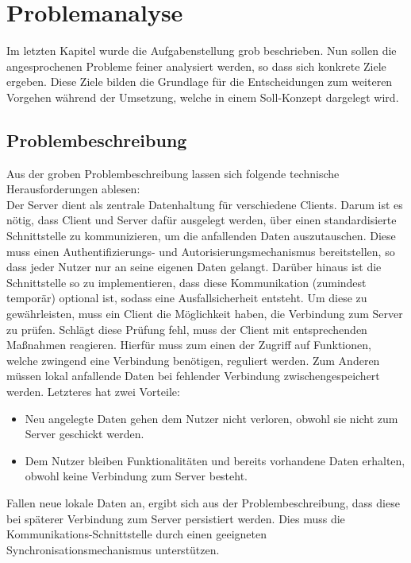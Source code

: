 \chapter{Problemanalyse}
\label{cha:problemanalyse}
Im letzten Kapitel wurde die Aufgabenstellung grob beschrieben. Nun sollen die angesprochenen Probleme feiner analysiert werden, so dass sich konkrete Ziele ergeben. Diese Ziele bilden die Grundlage für die Entscheidungen zum weiteren Vorgehen während der Umsetzung, welche in einem Soll-Konzept dargelegt wird.
\section{Problembeschreibung}
\label{sec:problembeschreibung}
Aus der groben Problembeschreibung lassen sich folgende technische Herausforderungen ablesen:\\
Der Server dient als zentrale Datenhaltung für verschiedene Clients. Darum ist es nötig, dass Client und Server dafür ausgelegt werden, über einen standardisierte Schnittstelle zu kommunizieren, um die anfallenden Daten auszutauschen. Diese muss einen Authentifizierungs- und Autorisierungsmechanismus bereitstellen, so dass jeder Nutzer nur an seine eigenen Daten gelangt. Darüber hinaus ist die Schnittstelle so zu implementieren, dass diese Kommunikation (zumindest temporär) optional ist, sodass eine Ausfallsicherheit entsteht. Um diese zu gewährleisten, muss ein Client die Möglichkeit haben, die Verbindung zum Server zu prüfen. Schlägt diese Prüfung fehl, muss der Client mit entsprechenden Maßnahmen reagieren. Hierfür muss zum einen der Zugriff auf Funktionen, welche zwingend eine Verbindung benötigen, reguliert werden. Zum Anderen müssen lokal anfallende Daten bei fehlender Verbindung zwischengespeichert werden. Letzteres hat zwei Vorteile:
\begin{itemize}
\item Neu angelegte Daten gehen dem Nutzer nicht verloren, obwohl sie nicht zum Server geschickt werden.
\item Dem Nutzer bleiben Funktionalitäten und bereits vorhandene Daten erhalten, obwohl keine Verbindung zum Server besteht.
\end{itemize}
Fallen neue lokale Daten an, ergibt sich aus der Problembeschreibung, dass diese bei späterer Verbindung zum Server persistiert werden. Dies muss die Kommunikations-Schnittstelle durch einen geeigneten Synchronisationsmechanismus unterstützen. 


